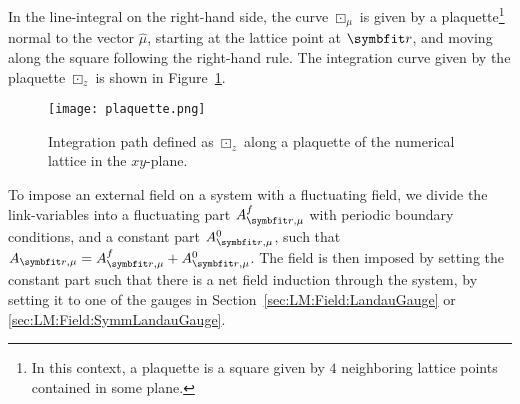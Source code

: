 In the line-integral on the right-hand side, the curve $\boxdot_\mu$ is given by a plaquette\footnote{In this context, a plaquette is a square given by $4$ neighboring lattice points contained in some plane.}
normal to the vector $\hat{\mu}$, starting at the lattice point at $\v{r}$, and moving along the square following the right-hand rule. The integration curve given by the plaquette $\boxdot_z$
is shown in Figure~\ref{fig:LM:Field:Fluc:plaquetteSum}.
\begin{figure}[h]
    \centering
    \texttt{[image: plaquette.png]}
    \caption{Integration path defined as $\boxdot_z$ along a plaquette of the numerical lattice in the $xy$-plane.}
    \label{fig:LM:Field:Fluc:plaquetteSum}
\end{figure}

To impose an external field on a system with a fluctuating field, we divide the link-variables into a fluctuating part $A^f_{\v{r},\mu}$ with periodic boundary conditions,
and a constant part $A^0_{\v{r},\mu}$, such that $A_{\v{r},\mu} = A^f_{\v{r},\mu} + A^0_{\v{r},\mu}$. The field is then imposed by setting the constant part such that there is a
net field induction through the system, \eg by setting it to one of the gauges in Section~\ref{sec:LM:Field:LandauGauge} or \ref{sec:LM:Field:SymmLandauGauge}.



